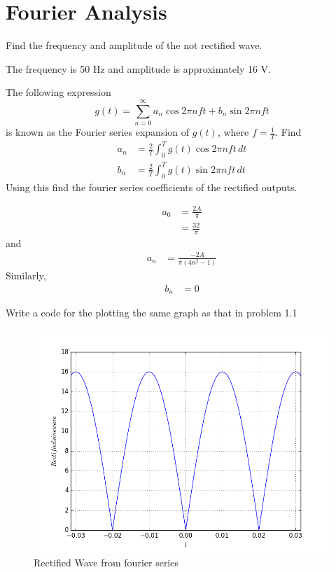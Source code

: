 \documentclass[journal,12pt,twocolumn]{IEEEtran}
\begin{document}
\section{Fourier Analysis}
\begin{problem}
Find the frequency and amplitude of the not rectified wave.
\end{problem}
\solution
The frequency is 50 Hz and amplitude is approximately 16 V.
\begin{problem}
The following expression
%
\begin{equation}
g(t) = \sum_{n=0}^{\infty}a_n\cos 2\pi n f t + b_n \sin 2 \pi n f t
\end{equation}
is known as the Fourier series expansion of $g(t)$, where $f = \frac{1}{T}$.  Find 
\begin{align}
a_n &= \frac{2}{T} \int_{0}^{T}g(t) \cos 2\pi nf t \, dt \\
b_n &= \frac{2}{T} \int_{0}^{T}g(t) \sin 2\pi nf t \, dt
\end{align}
Using this find the fourier series coefficients of the rectified outputs.
\end{problem}
%
\solution 
\begin{align}
a_0 &= \frac{2A}{\pi}\\
&=\frac{32}{\pi}
\end{align}
and
\begin{align}
a_n &= \frac{-2A}{\pi(4n^2-1)}
\end{align}
Similarly, 
\begin{align}
b_n & = 0
\end{align}

\begin{problem}
Write a code for the plotting the same graph as that in problem 1.1
\end{problem}
\solution


\begin{figure}[h]
\centering
	\includegraphics[scale=0.4]{./figs/fourierrectified.png}
	\caption{Rectified Wave from fourier series}  \label{recf}
    \end{figure}
\end{document}
